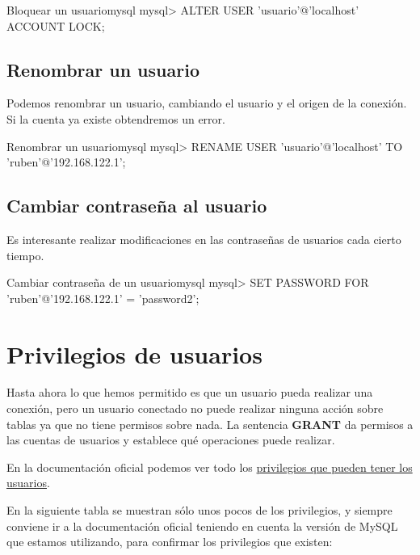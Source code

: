 \begin{mycode}{Bloquear un usuario}{mysql}{}
mysql> ALTER USER 'usuario'@'localhost' ACCOUNT LOCK;
\end{mycode}


\subsection{Renombrar un usuario}
Podemos renombrar un usuario, cambiando el usuario y el origen de la conexión. Si la cuenta ya existe obtendremos un error.

\begin{mycode}{Renombrar un usuario}{mysql}{}
mysql> RENAME USER 'usuario'@'localhost' TO 'ruben'@'192.168.122.1';
\end{mycode}


\subsection{Cambiar contraseña al usuario}
Es interesante realizar modificaciones en las contraseñas de usuarios cada cierto tiempo.

\begin{mycode}{Cambiar contraseña de un usuario}{mysql}{}
mysql> SET PASSWORD FOR 'ruben'@'192.168.122.1' = 'password2';
\end{mycode}

\section{Privilegios de usuarios}
Hasta ahora lo que hemos permitido es que un usuario pueda realizar una conexión, pero un usuario conectado no puede realizar ninguna acción sobre tablas ya que no tiene permisos sobre nada. La sentencia \textbf{GRANT} da permisos a las cuentas de usuarios y establece qué operaciones puede realizar.

En la documentación oficial podemos ver todo los \href{https://dev.mysql.com/doc/refman/8.0/en/privileges-provided.html}{privilegios que pueden tener los usuarios}.

En la siguiente tabla se muestran sólo unos pocos de los privilegios, y siempre conviene ir a la documentación oficial teniendo en cuenta la versión de MySQL que estamos utilizando, para confirmar los privilegios que existen:

